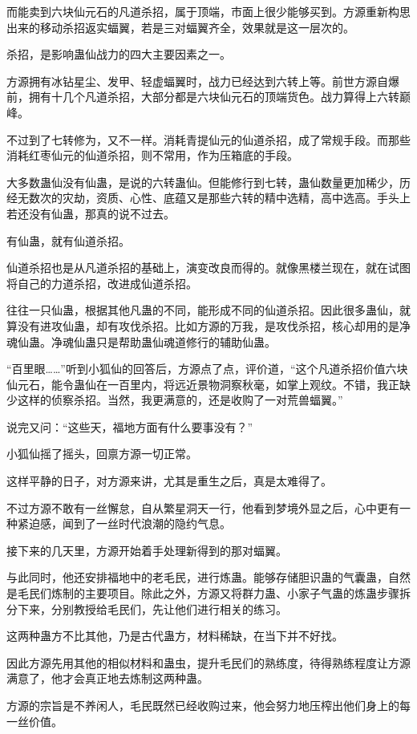 \begin{this_body}
而能卖到六块仙元石的凡道杀招，属于顶端，市面上很少能够买到。方源重新构思出来的移动杀招返实蝠翼，若是三对蝠翼齐全，效果就是这一层次的。

杀招，是影响蛊仙战力的四大主要因素之一。

方源拥有冰钻星尘、发甲、轻虚蝠翼时，战力已经达到六转上等。前世方源自爆前，拥有十几个凡道杀招，大部分都是六块仙元石的顶端货色。战力算得上六转巅峰。

不过到了七转修为，又不一样。消耗青提仙元的仙道杀招，成了常规手段。而那些消耗红枣仙元的仙道杀招，则不常用，作为压箱底的手段。

大多数蛊仙没有仙蛊，是说的六转蛊仙。但能修行到七转，蛊仙数量更加稀少，历经无数次的灾劫，资质、心性、底蕴又是那些六转的精中选精，高中选高。手头上若还没有仙蛊，那真的说不过去。

有仙蛊，就有仙道杀招。

仙道杀招也是从凡道杀招的基础上，演变改良而得的。就像黑楼兰现在，就在试图将自己的力道杀招，改进成仙道杀招。

往往一只仙蛊，根据其他凡蛊的不同，能形成不同的仙道杀招。因此很多蛊仙，就算没有进攻仙蛊，却有攻伐杀招。比如方源的万我，是攻伐杀招，核心却用的是净魂仙蛊。净魂仙蛊只是帮助蛊仙魂道修行的辅助仙蛊。

“百里眼……”听到小狐仙的回答后，方源点了点，评价道，“这个凡道杀招价值六块仙元石，能令蛊仙在一百里内，将远近景物洞察秋毫，如掌上观纹。不错，我正缺少这样的侦察杀招。当然，我更满意的，还是收购了一对荒兽蝠翼。”

说完又问：“这些天，福地方面有什么要事没有？”

小狐仙摇了摇头，回禀方源一切正常。

这样平静的日子，对方源来讲，尤其是重生之后，真是太难得了。

不过方源不敢有一丝懈怠，自从繁星洞天一行，他看到梦境外显之后，心中更有一种紧迫感，闻到了一丝时代浪潮的隐约气息。

接下来的几天里，方源开始着手处理新得到的那对蝠翼。

与此同时，他还安排福地中的老毛民，进行炼蛊。能够存储胆识蛊的气囊蛊，自然是毛民们炼制的主要项目。除此之外，方源又将群力蛊、小家子气蛊的炼蛊步骤拆分下来，分别教授给毛民们，先让他们进行相关的练习。

这两种蛊方不比其他，乃是古代蛊方，材料稀缺，在当下并不好找。

因此方源先用其他的相似材料和蛊虫，提升毛民们的熟练度，待得熟练程度让方源满意了，他才会真正地去炼制这两种蛊。

方源的宗旨是不养闲人，毛民既然已经收购过来，他会努力地压榨出他们身上的每一丝价值。


\end{this_body}
